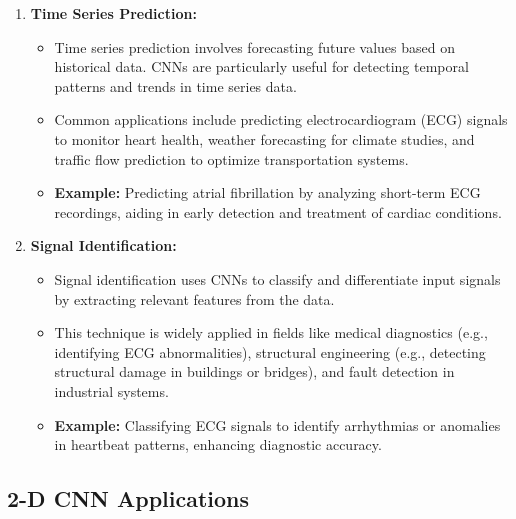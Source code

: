 \begin{enumerate}
	\item \textbf{Time Series Prediction:}
	\begin{itemize}
		\item Time series prediction involves forecasting future values based on historical data. CNNs are particularly useful for detecting temporal patterns and trends in time series data.
		\item Common applications include predicting electrocardiogram (ECG) signals to monitor heart health, weather forecasting for climate studies, and traffic flow prediction to optimize transportation systems.
		\item \textbf{Example:} Predicting atrial fibrillation by analyzing short-term ECG recordings, aiding in early detection and treatment of cardiac conditions.
	\end{itemize}
	
	\item \textbf{Signal Identification:}
	\begin{itemize}
		\item Signal identification uses CNNs to classify and differentiate input signals by extracting relevant features from the data.
		\item This technique is widely applied in fields like medical diagnostics (e.g., identifying ECG abnormalities), structural engineering (e.g., detecting structural damage in buildings or bridges), and fault detection in industrial systems.
		\item \textbf{Example:} Classifying ECG signals to identify arrhythmias or anomalies in heartbeat patterns, enhancing diagnostic accuracy.
	\end{itemize}
\end{enumerate}


\subsection{2-D CNN Applications}

